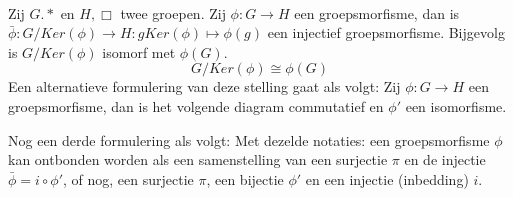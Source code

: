 \documentclass[main.tex]{subfiles}
\begin{document}
\begin{st}
  \examen
  \label{st:eerste-isomorfismestelling}
  \\
  Zij $G.*$ en $H,\Box$ twee groepen.
  Zij $\phi: G \rightarrow H$ een groepsmorfisme, dan is $\bar{\phi}: G/Ker(\phi) \rightarrow H: gKer(\phi) \mapsto \phi(g)$ een injectief groepsmorfisme.
  Bijgevolg is $G/Ker(\phi)$ isomorf met $\phi(G)$. 
  \[ G/Ker(\phi) \cong \phi(G) \]
  Een alternatieve formulering van deze stelling gaat als volgt:
  Zij $\phi: G \rightarrow H$ een groepsmorfisme, dan is het volgende diagram commutatief en $\phi'$ een isomorfisme.
  \begin{figure}[H]
    \centering
  \end{figure}
  Nog een derde formulering als volgt:
  Met dezelde notaties: een groepsmorfisme $\phi$ kan ontbonden worden als een samenstelling van een surjectie $\pi$ en de injectie $\bar{\phi} = i \circ \phi'$, of nog, een surjectie $\pi$, een bijectie $\phi'$ en een injectie (inbedding) $i$.


\end{st}
\end{document}
